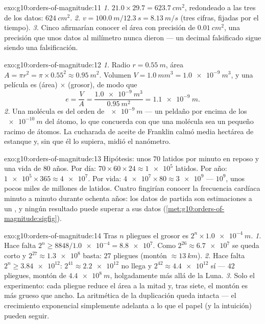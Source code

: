 \begin{solution}{exo:g10:orders-of-magnitude:11}
\emph{1.} $21.0 \times 29.7 = \qty{623.7}{cm^2}$, redondeado a las tres
 de los datos: $\qty{624}{cm^2}$.
\emph{2.} $v = \qty{100.0}{m}/\qty{12.3}{s} = \qty{8.13}{m/s}$ (tres
cifras, fijadas por el tiempo).
\emph{3.} Cinco  afirmarían conocer el área con
precisión de $\qty{0.01}{cm^2}$, una precisión que unos datos al
milímetro nunca dieron --- un decimal falsificado sigue siendo una
falsificación.
\end{solution}

\begin{solution}{exo:g10:orders-of-magnitude:12}
\emph{1.} Radio $r = \qty{0.55}{m}$, área
$A = \pi r^{2} = \pi \times 0.55^{2} \approx \qty{0.95}{m^2}$. Volumen
$V = \qty{1.0}{mm^3} = \qty{1.0e-9}{m^3}$, y una película es (área)
$\times$ (grosor), de modo que
\[
e = \frac{V}{A} = \frac{\qty{1.0e-9}{m^3}}{\qty{0.95}{m^2}}
= \qty{1.1e-9}{m} .
\]
\emph{2.} Una molécula es del orden de $\qty{e-9}{m}$ --- un peldaño por
encima de los $\qty{e-10}{m}$ del átomo, lo que concuerda con que una
molécula sea un pequeño racimo de átomos. La cucharada de aceite de
Franklin calmó media hectárea de estanque y, sin que él lo supiera,
midió el nanómetro.
\end{solution}

\begin{solution}{exo:g10:orders-of-magnitude:13}
Hipótesis: unos $70$ latidos por minuto en reposo y una vida de $80$
años. Por día: $70 \times 60 \times 24 \approx \num{1e5}$ latidos. Por
año: $\num{1e5} \times 365 \approx \num{4e7}$. Por vida:
$\num{4e7} \times 80 \approx \num{3e9}$ ---  $10^{9}$,
unos pocos miles de millones de latidos. Cuatro 
fingirían conocer la frecuencia cardíaca minuto a minuto durante ochenta
años: los datos de partida son estimaciones a un , y
ningún resultado puede superar a sus datos
(\cref{met:g10:orders-of-magnitude:sigfig}).
\end{solution}

\begin{solution}{exo:g10:orders-of-magnitude:14}
Tras $n$ pliegues el grosor es $2^{n} \times \qty{1.0e-4}{m}$.
\emph{1.} Hace falta $2^{n} \geq 8848/\num{1.0e-4} = \num{8.8e7}$. Como
$2^{26} \approx \num{6.7e7}$ se queda corto y
$2^{27} \approx \num{1.3e8}$ basta: $27$ pliegues (montón
$\approx \qty{13}{km}$).
\emph{2.} Hace falta $2^{n} \geq \num{3.84e12}$: $2^{41} \approx
\num{2.2e12}$ no llega y $2^{42} \approx \num{4.4e12}$ sí ---
$42$ pliegues, montón de $\qty{4.4e8}{m}$, holgadamente más allá de la
Luna.
\emph{3.} Solo el experimento: cada pliegue reduce el área a la mitad y,
tras siete, el montón es más grueso que ancho. La aritmética de la
duplicación queda intacta --- el crecimiento exponencial simplemente
adelanta a lo que el papel (y la intuición) pueden seguir.
\end{solution}

